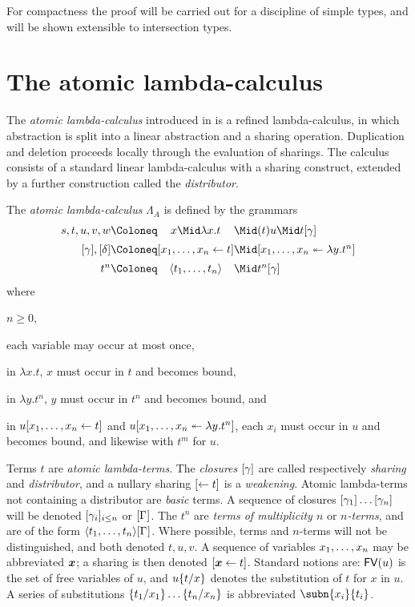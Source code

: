 \documentclass[orivec]{llncs}
\begin{document}
For compactness the proof will be carried out for a discipline of simple types, and will be shown extensible to intersection types.



\section{The atomic lambda-calculus}
\label{sec:atomic-lambda-calculus}



The \emph{atomic lambda-calculus} introduced in \cite{Gundersen-Heijltjes-Parigot-2013-LICS} is a refined lambda-calculus, in which abstraction is split into a linear abstraction and a sharing operation.
%
Duplication and deletion proceeds locally through the evaluation of sharings.
%
The calculus consists of a standard linear lambda-calculus with a sharing construct, extended by a further construction called the \emph{distributor}.



\begin{ALdefinition}
%
The \emph{atomic lambda-calculus} $\Lambda_A$ is defined by the grammars
%
\setMidspace{10pt}
\[
\begin{array}{r@{\Coloneq}c@{\Mid}l}
	s,t,u,v,w
	&	x \Mid \lambda x.t
	&	(t)u \Mid t\g
\\[5pt]
	\g,\g*  &  \share xt  &  \distr xy{t^n}
\\[5pt]
	t^n  &  \tup t  &  t^n\g
\end{array}
\]
where
%
\begin{inparaenum}[(i)]
\item $n\geq0$, 
%
\item each variable may occur at most once,
%
\item in $\lambda x.t$, $x$ must occur in $t$ and becomes bound,
%
\item in $\lambda y.t^n$, $y$ must occur in $t^n$ and becomes bound, and
%
\item in $u\share xt$ and $u\distr xy{t^n}$, each $x_i$ must occur in $u$ and becomes bound, and likewise with $t^m$ for $u$.
%
\end{inparaenum}
%
\end{ALdefinition}

Terms $t$ are \emph{atomic lambda-terms}.
%
The \emph{closures} $\g$ are called respectively \emph{sharing} and \emph{distributor}, and a nullary sharing $\share*{}t$ is a \emph{weakening}.
%
Atomic lambda-terms not containing a distributor are \emph{basic} terms.
%
A sequence of closures $\g[1]\ldots\g[n]$ will be denoted $\g[i]_{i\leq n}$ or $\G$.
%
The $t^n$ are \emph{terms of multiplicity $n$} or \emph{$n$-terms}, and are of the form $\tup t\G$.
%
Where possible, terms and $n$-terms will not be distinguished, and both denoted $t,u,v$.
%
A sequence of variables $\vv x$ may be abbreviated $\vv*x$; a sharing is then denoted $\share*{\vv*x}t$.
%
Standard notions are: $\FV(u)$ is the set of free variables of $u$, and $u\sub xt$ denotes the substitution of $t$ for $x$ in $u$.
%
A series of substitutions $\sub{x_1}{t_1}\dotso\sub{x_n}{t_n}$ is abbreviated $\subn{x_i}{t_i}$.
\end{document}
